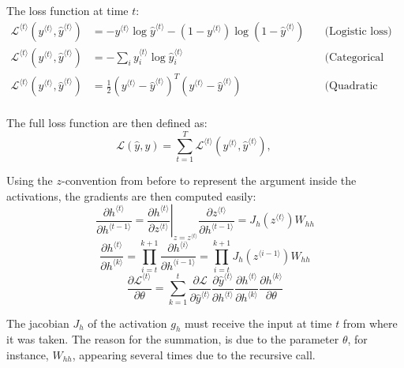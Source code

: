 \documentclass[a4paper, 12pt]{report}
\begin{document}
The loss function at time $t$:
\begin{equation}
\begin{array}{lll}
\mathcal L^{\langle t\rangle}(y^{\langle t\rangle}, \hat y^{\langle t\rangle}) &= -y^{\langle t\rangle}\log\hat y^{\langle t\rangle} - (1-y^{\langle t\rangle})\log(1-\hat y^{\langle t\rangle})\quad&\text{(Logistic loss)} \\
\mathcal L^{\langle t\rangle}(y^{\langle t\rangle}, \hat y^{\langle t\rangle}) &= -\sum_i y_i^{\langle t\rangle}\log\hat y_i^{\langle t\rangle}\quad&\text{(Categorical cross-entropy)} \\
\mathcal L^{\langle t\rangle}(y^{\langle t\rangle}, \hat y^{\langle t\rangle}) &= \frac{1}{2}(y^{\langle t\rangle}-\hat y^{\langle t\rangle})^T(y^{\langle t\rangle}-\hat y^{\langle t\rangle})&\text{(Quadratic Loss)} \\
\end{array}
\end{equation}

The full loss function are then defined as:
\begin{equation}
\mathcal L(\hat y, y) = \sum_{t=1}^{T}\mathcal L^{\langle t\rangle}(y^{\langle t\rangle}, \hat y^{\langle t\rangle}),\quad\quad
\end{equation}

Using the $z$-convention from before to represent the argument inside the activations, the gradients are then computed easily:
\begin{equation}
\frac{\partial h^{\langle t\rangle}}{\partial h^{\langle t-1\rangle}}
=\left.\frac{\partial h^{\langle t\rangle}}{\partial z^{\langle t\rangle}}\right|_{z=z^{\langle t\rangle}}\frac{\partial z^{\langle t\rangle}}{\partial h^{\langle t-1\rangle}}
=J_h(z^{\langle t\rangle}) W_{hh}
\end{equation}
\begin{equation}
\frac{\partial h^{\langle t\rangle}}{\partial h^{\langle k\rangle}}
=\prod_{i=t}^{k+1}\frac{\partial h^{\langle i\rangle}}{\partial h^{\langle i-1\rangle}}
=\prod_{i=t}^{k+1} J_h(z^{\langle i-1\rangle}) W_{hh}
\end{equation}
\begin{equation}
\frac{\partial\mathcal L^{\langle t\rangle}}{\partial\theta}
=\sum_{k=1}^t
\frac{\partial\mathcal L}{\partial\hat y^{\langle t\rangle}}
\frac{\partial\hat y^{\langle t\rangle}}{\partial h^{\langle t\rangle}}
\frac{\partial h^{\langle t\rangle}}{\partial h^{\langle k\rangle}}
\frac{\partial h^{\langle k\rangle}}{\partial\theta}
\end{equation}

The jacobian $J_h$ of the activation $g_h$ must receive the input at time $t$ from where it was taken.
The reason for the summation, is due to the parameter $\theta$, for instance, $W_{hh}$, appearing several times due to the recursive call.
\end{document}
